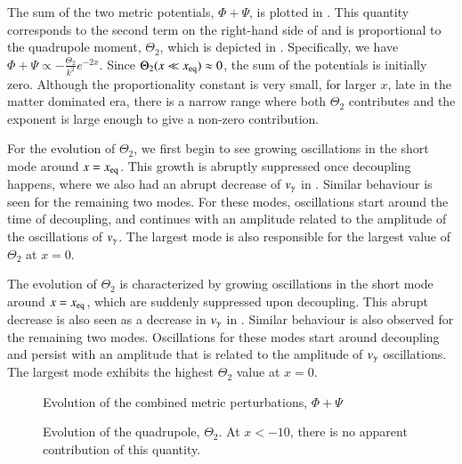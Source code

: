 The sum of the two metric potentials, $\Phi+\Psi$, is plotted in . This quantity corresponds to the second term on the right-hand side of  and is proportional to the quadrupole moment, $\Theta_2$, which is depicted in . Specifically, we have $\Phi+\Psi \propto -\frac{\Theta_2}{k^2} e^{-2x}$. Since $\Theta_2(x\ll x_\mathrm{eq})\approx 0$, the sum of the potentials is initially zero. Although the proportionality constant is very small, for larger $x$, late in the matter dominated era, there is a narrow range where both $\Theta_2$ contributes and the exponent is large enough to give a non-zero contribution.

For the evolution of $\Theta_2$, we first begin to see growing oscillations in the short mode around $x=x_\mathrm{eq}$. This growth is abruptly suppressed once decoupling happens, where we also had an abrupt decrease of $v_\gamma$ in . Similar behaviour is seen for the remaining two modes. For these modes, oscillations start around the time of decoupling, and continues with an amplitude related to the amplitude of the oscillations of $v_\gamma$. The largest mode is also responsible for the largest value of $\Theta_2$ at $x=0$. 

The evolution of $\Theta_2$ is characterized by growing oscillations in the short mode around $x=x_\mathrm{eq}$, which are suddenly suppressed upon decoupling. This abrupt decrease is also seen as a decrease in $v_\gamma$ in . Similar behaviour is also observed for the remaining two modes. Oscillations for these modes start around decoupling and persist with an amplitude that is related to the amplitude of $v_\gamma$ oscillations. The largest mode exhibits the highest $\Theta_2$ value at $x=0$.

\begin{figure}[ht!]
    \caption{Evolution of the combined metric perturbations, $\Phi+\Psi$}
    \label{fig:M3:results:Phi_plus_Psi}
\end{figure}

  
\begin{figure}[ht!]
    \caption{Evolution of the quadrupole, $\Theta_2$. At $x<-10$, there is no apparent contribution of this quantity.}
    \label{fig:M3:results:Theta2}
\end{figure}
